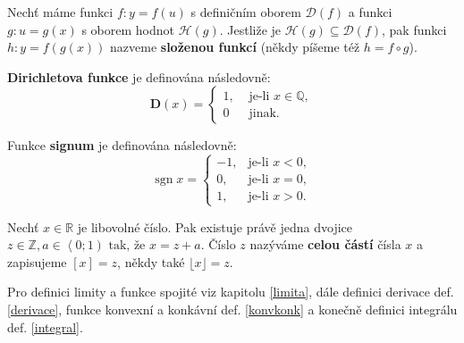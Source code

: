 \begin{definition}
  Nechť máme funkci $f\colon y = f(u)$ s definičním oborem $\mathcal D(f)$ a funkci $g\colon u=g(x)$ s oborem hodnot $\mathcal H(g)$. Jestliže je $\mathcal H(g) \subseteq \mathcal D(f)$, pak funkci $h\colon y = f(g(x))$ nazveme \textbf{složenou funkcí} (někdy píšeme též $h=f \circ g$).
\end{definition}

\begin{definition}
  \textbf{Dirichletova funkce} je definována následovně:
  $$\mathbf{D} (x) = \begin{cases}
1, & \text{ je-li } x \in \mathbb Q, \\
0 & \text{ jinak}.
  \end{cases}  $$
\end{definition}

\begin{definition}
  Funkce \textbf{signum} je definována následovně: $$\operatorname {sgn} x={\begin{cases}-1,& \textrm{je-li }x<0,\\0,&\textrm{je-li }x=0,\\1,&\textrm{je-li }x>0.\end{cases}}$$
\end{definition}

\begin{definition}
  Nechť $x \in \mathbb{R}$ je libovolné číslo. Pak existuje právě jedna dvojice $z \in \mathbb{Z}, a \in \left<  0;1 \right) \text{ tak, že } x = z + a$.
Číslo $z$ nazýváme \textbf{celou částí} čísla $x$ a zapisujeme $[x] = z$, někdy také $\lfloor x\rfloor = z$.
\end{definition}

\begin{pozn}
    Pro definici limity a funkce spojité viz kapitolu \ref{limita},
    dále definici derivace def. \ref{derivace}, funkce konvexní a
    konkávní def. \ref{konvkonk} a konečně definici integrálu def. \ref{integral}.
\end{pozn}
